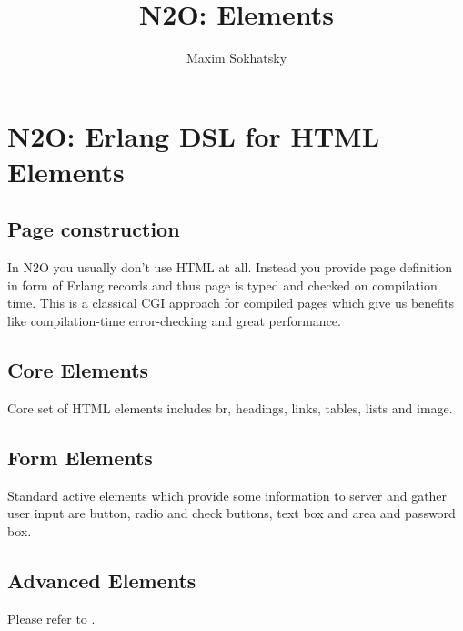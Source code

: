 \documentclass[11pt]{article}
\begin{document}
\title{N2O: Elements}
\author{Maxim Sokhatsky}

\paragraph{}
\section*{N2O: Erlang DSL for HTML Elements}

\subsection*{Page construction}
In N2O you usually don't use HTML at all. Instead you provide page definition
in form of Erlang records and thus page is typed and checked on compilation time.
This is a classical CGI approach for compiled pages which give us benefits like
compilation-time error-checking and great performance.

\subsection*{Core Elements}
Core set of HTML elements includes br, headings, links, tables, lists and image.

\subsection*{Form Elements}
Standard active elements which provide some information to server
and gather user input are button, radio and check buttons, text box and area and password box.

\subsection*{Advanced Elements}
Please refer to .







\end{document}
